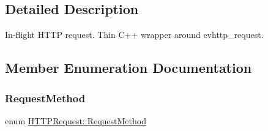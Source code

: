 \subsection{Detailed Description}
In-\/flight H\+T\+TP request. Thin C++ wrapper around evhttp\+\_\+request. 

\subsection{Member Enumeration Documentation}
\mbox{\label{class_h_t_t_p_request_a1afe92e9caad997b8f88f0cb07dcc5aa}} 
\subsubsection{\texorpdfstring{Request\+Method}{RequestMethod}}
{\footnotesize\ttfamily enum \mbox{\hyperlink{class_h_t_t_p_request_a1afe92e9caad997b8f88f0cb07dcc5aa}{H\+T\+T\+P\+Request\+::\+Request\+Method}}}

